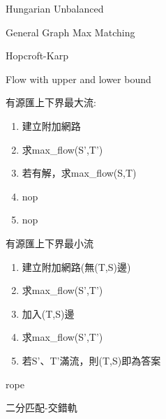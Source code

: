 \documentclass[12pt]{article}
\begin{document}
\begin{section}{Hungarian Unbalanced}
  
\end{section}
 
\begin{section}{General Graph Max Matching}
  
\end{section}

\begin{section}{Hopcroft-Karp}
  \begin{multicols}{2}
    
  \end{multicols}
\end{section}

\begin{section}{Flow with upper and lower bound}
  \begin{multicols}{2}
    有源匯上下界最大流:
    \begin{enumerate}
      \item 建立附加網路
      \item 求max\_flow(S',T')
      \item 若有解，求max\_flow(S,T)
      \item nop
      \item nop
    \end{enumerate}
    有源匯上下界最小流
    \begin{enumerate}
      \item 建立附加網路(無(T,S)邊)
      \item 求max\_flow(S',T')
      \item 加入(T,S)邊
      \item 求max\_flow(S',T')
      \item 若S'、T'滿流，則(T,S)即為答案
    \end{enumerate}
  \end{multicols}
\end{section}

\begin{section}{rope}
  \begin{multicols}{2}
    
  \end{multicols}
\end{section}

\begin{section}{二分匹配-交錯軌}
  \begin{multicols}{2}
    
  \end{multicols}
\end{section}
\end{document}
